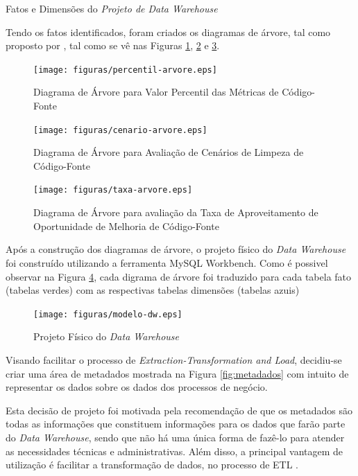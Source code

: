 \begin{table}[h]
\centering

\caption{Fatos e Dimensões do \textit{Projeto de Data Warehouse} }
\label{tab:dimensoes-fato}
\end{table}
\FloatBarrier

Tendo os fatos identificados, foram criados os diagramas de árvore, tal como proposto por , tal como se vê nas Figuras \ref{fig:percentil-arvore}, \ref{fig:cenario-arvore} e \ref{fig:taxa-arvore}.

\begin{figure}[h]
\centering
\texttt{[image: figuras/percentil-arvore.eps]}
\caption{Diagrama de Árvore para Valor Percentil das Métricas de Código-Fonte}
\label{fig:percentil-arvore}
\end{figure}
\FloatBarrier


\begin{figure}[h]
\centering
\texttt{[image: figuras/cenario-arvore.eps]}
\caption{Diagrama de Árvore para Avaliação de Cenários de Limpeza de Código-Fonte}
\label{fig:cenario-arvore}
\end{figure}
\FloatBarrier


\begin{figure}[ht!]
\centering
\texttt{[image: figuras/taxa-arvore.eps]}
\caption{Diagrama de Árvore para avaliação da Taxa de Aproveitamento de Oportunidade de Melhoria de Código-Fonte}
\label{fig:taxa-arvore}
\end{figure}
\FloatBarrier


Após a construção dos diagramas de árvore, o projeto físico do \textit{Data Warehouse} foi construído utilizando a ferramenta MySQL Workbench. Como é possivel observar na Figura \ref{fig:project-dw}, cada digrama de árvore foi traduzido para cada tabela fato (tabelas verdes) com as respectivas tabelas dimensões (tabelas azuis)


\begin{figure}[ht!]
\centering
\texttt{[image: figuras/modelo-dw.eps]}
\caption{Projeto Físico do \textit{Data Warehouse}}
\label{fig:project-dw}
\end{figure}
\FloatBarrier

Visando facilitar o processo de \textit{Extraction-Transformation and Load}, decidiu-se criar uma área de metadados mostrada na Figura \ref{fig:metadados} com intuito de representar os dados sobre os dados dos processos de negócio.

Esta decisão de projeto foi motivada pela recomendação de que os metadados são todas as informações que constituem informações para os dados que farão parte do \textit{Data Warehouse}, sendo que não há uma única forma de fazê-lo para atender as necessidades técnicas e administrativas. Além disso, a principal vantagem de utilização é facilitar a transformação de dados, no processo de ETL \cite{Kimball2002}.


